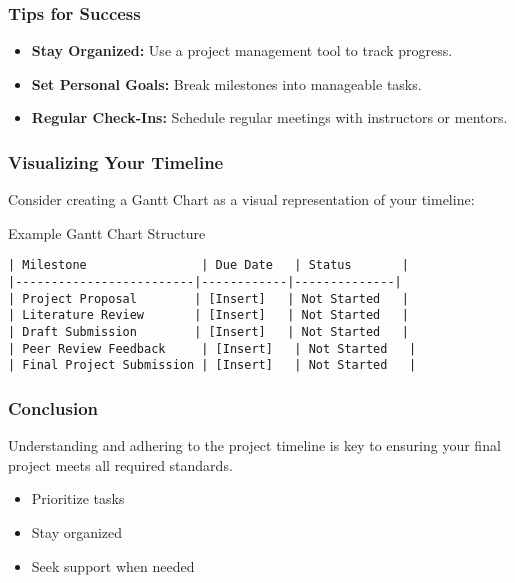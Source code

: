 \documentclass[aspectratio=169]{beamer}
\begin{document}
\begin{frame}[fragile]
    \frametitle{Tips for Success}
    \begin{itemize}
        \item \textbf{Stay Organized:} Use a project management tool to track progress.
        \item \textbf{Set Personal Goals:} Break milestones into manageable tasks.
        \item \textbf{Regular Check-Ins:} Schedule regular meetings with instructors or mentors.
    \end{itemize}
\end{frame}

\begin{frame}[fragile]
    \frametitle{Visualizing Your Timeline}
    Consider creating a Gantt Chart as a visual representation of your timeline:
    \begin{block}{Example Gantt Chart Structure}
    \begin{lstlisting}
| Milestone                | Due Date   | Status       |
|-------------------------|------------|--------------|
| Project Proposal        | [Insert]   | Not Started   |
| Literature Review       | [Insert]   | Not Started   |
| Draft Submission        | [Insert]   | Not Started   |
| Peer Review Feedback     | [Insert]   | Not Started   |
| Final Project Submission | [Insert]   | Not Started   |
    \end{lstlisting}
    \end{block}
\end{frame}

\begin{frame}[fragile]
    \frametitle{Conclusion}
    Understanding and adhering to the project timeline is key to ensuring your final project meets all required standards.
    \begin{itemize}
        \item Prioritize tasks
        \item Stay organized
        \item Seek support when needed
    \end{itemize}
\end{frame}
\end{document}
